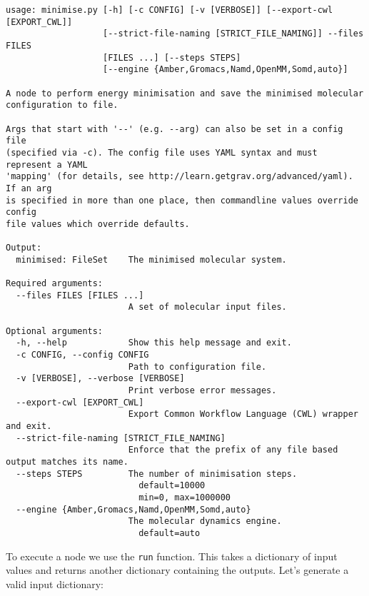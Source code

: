 \begin{verbatim}
usage: minimise.py [-h] [-c CONFIG] [-v [VERBOSE]] [--export-cwl [EXPORT_CWL]]
                   [--strict-file-naming [STRICT_FILE_NAMING]] --files FILES
                   [FILES ...] [--steps STEPS]
                   [--engine {Amber,Gromacs,Namd,OpenMM,Somd,auto}]

A node to perform energy minimisation and save the minimised molecular
configuration to file.

Args that start with '--' (e.g. --arg) can also be set in a config file
(specified via -c). The config file uses YAML syntax and must represent a YAML
'mapping' (for details, see http://learn.getgrav.org/advanced/yaml). If an arg
is specified in more than one place, then commandline values override config
file values which override defaults.

Output:
  minimised: FileSet    The minimised molecular system.

Required arguments:
  --files FILES [FILES ...]
                        A set of molecular input files.

Optional arguments:
  -h, --help            Show this help message and exit.
  -c CONFIG, --config CONFIG
                        Path to configuration file.
  -v [VERBOSE], --verbose [VERBOSE]
                        Print verbose error messages.
  --export-cwl [EXPORT_CWL]
                        Export Common Workflow Language (CWL) wrapper and exit.
  --strict-file-naming [STRICT_FILE_NAMING]
                        Enforce that the prefix of any file based output matches its name.
  --steps STEPS         The number of minimisation steps.
                          default=10000
                          min=0, max=1000000
  --engine {Amber,Gromacs,Namd,OpenMM,Somd,auto}
                        The molecular dynamics engine.
                          default=auto
\end{verbatim}

To execute a node we use the \texttt{run} function. This takes a
dictionary of input values and returns another dictionary containing the
outputs. Let's generate a valid input dictionary:

\begin{Shaded}
\begin{Highlighting}[]
 \OperatorTok{=}\NormalTok{ \{}\NormalTok{ : [}\NormalTok{, }\NormalTok{],}
         \NormalTok{ : }
\NormalTok{        \}}
\end{Highlighting}
\end{Shaded}

